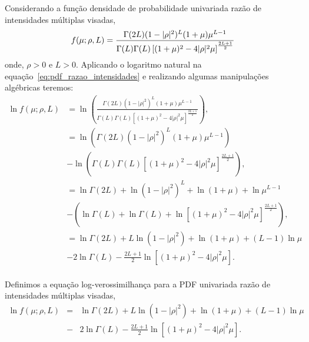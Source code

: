 \documentclass[12pt]{article}
\begin{document}
Considerando a função densidade de probabilidade univariada razão de intensidades múltiplas visadas,
\begin{equation}\label{eq:pdf_razao_intensidades}
	f(\mu;\rho,L)=\frac{\Gamma(2L)(1-|\rho|^2)^{L}(1+\mu)\mu^{L-1}}{\Gamma(L)\Gamma(L)\left[(1+\mu)^2-4|\rho|^2\mu \right]^{\frac{2L+1}{2}}}\\
\end{equation}
onde, $\rho>0$ e $L>0$. Aplicando o logaritmo natural na equação~\eqref{eq:pdf_razao_intensidades} e realizando algumas manipulações algébricas teremos:
\begin{equation}\nonumber
\begin{split}
	\ln f(\mu;\rho,L)&=\ln\left(\frac{\Gamma(2L)(1-|\rho|^2)^{L}(1+\mu)\mu^{L-1}}{\Gamma(L)\Gamma(L)\left[(1+\mu)^2-4|\rho|^2\mu \right]^{\frac{2L+1}{2}}}\right),\\
	                &=\ln\left(\Gamma(2L)(1-|\rho|^2)^{L}(1+\mu)\mu^{L-1}\right)\\
	                &-\ln\left(\Gamma(L)\Gamma(L)\left[(1+\mu)^2-4|\rho|^2\mu \right]^{\frac{2L+1}{2}}\right),\\
	                &=\ln\Gamma(2L) +\ln(1-|\rho|^2)^{L}+\ln(1+\mu)+\ln\mu^{L-1}\\
	                &-\left(\ln\Gamma(L)+\ln\Gamma(L)+\ln\left[(1+\mu)^2-4|\rho|^2\mu \right]^{\frac{2L+1}{2}}\right),\\
	                &=\ln\Gamma(2L) +L\ln(1-|\rho|^2)+\ln(1+\mu)+(L-1)\ln\mu\\
	                &-2\ln\Gamma(L)-\frac{2L+1}{2}\ln\left[(1+\mu)^2-4|\rho|^2\mu \right].\\
\end{split}
\end{equation}

Definimos a equação log-verossimilhança para a PDF univariada razão de intensidades múltiplas visadas,
\begin{equation}\label{eq_log_vero_razao_intensidade}
\begin{array}{lcl}	
	\ln f(\mu;\rho,L)&=&\ln\Gamma(2L) +L\ln(1-|\rho|^2)+\ln(1+\mu)+(L-1)\ln\mu\\
	&-&2\ln\Gamma(L)-\frac{2L+1}{2}\ln\left[(1+\mu)^2-4|\rho|^2\mu \right].\\
\end{array}
\end{equation}
\end{document}
